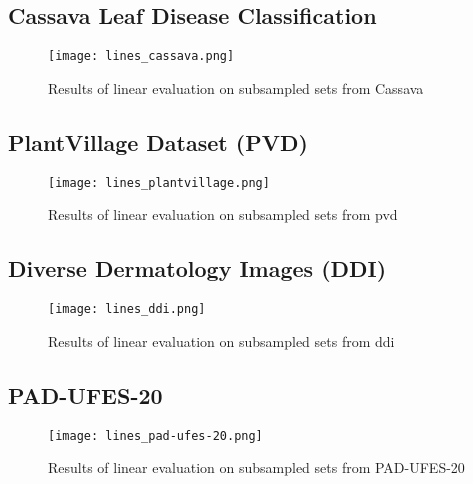 \subsection{Cassava Leaf Disease Classification}

\begin{figure}[H]
    \begin{center}
    \texttt{[image: lines\_cassava.png]}
    \caption{Results of linear evaluation on subsampled sets from Cassava}\label{fig:lines_cassava}
    \end{center}
\end{figure}

\subsection{PlantVillage Dataset (PVD)}

\begin{figure}[H]
    \begin{center}
    \texttt{[image: lines\_plantvillage.png]}
    \caption{Results of linear evaluation on subsampled sets from \gls{pvd}}\label{fig:lines_plantvillage}
    \end{center}
\end{figure}

\subsection{Diverse Dermatology Images (DDI)}

\begin{figure}[H]
    \begin{center}
    \texttt{[image: lines\_ddi.png]}
    \caption{Results of linear evaluation on subsampled sets from \gls{ddi}}\label{fig:lines_ddi}
    \end{center}
\end{figure}

\subsection{PAD-UFES-20}

\begin{figure}[H]
    \begin{center}
    \texttt{[image: lines\_pad-ufes-20.png]}
    \caption{Results of linear evaluation on subsampled sets from PAD-UFES-20}\label{fig:lines_pad-ufes-20}
    \end{center}
\end{figure}

